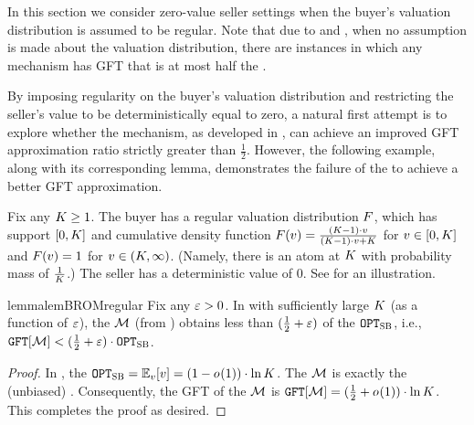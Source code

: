 
In this section we consider zero-value seller settings when the buyer's valuation distribution is assumed to be regular. Note that due to  and , when no assumption is made about the valuation distribution, there are instances in which any {\ksfair} mechanism has GFT that is at most half the {\SecondBest}.

By imposing regularity on the buyer's valuation distribution and restricting the seller's value to be deterministically equal to zero, a natural first attempt is to explore whether the {\BiasedRandomOffer} mechanism, as developed in , can achieve an improved GFT approximation ratio strictly greater than $\frac{1}{2}$. However, the following example, along with its corresponding lemma, demonstrates the failure of the {\BiasedRandomOffer} to achieve a better GFT approximation.

\begin{example}
\label{example:BROM:regular}
Fix any $K \geq 1$. The buyer has a regular valuation distribution $F$, which has support $[0, K]$ and cumulative density function $F(v) = \frac{(K - 1)\cdot v}{(K - 1)\cdot v + K}$ for $v \in[0,K]$ and $F(v) = 1$ for $v \in(K, \infty)$.
(Namely, there is an atom at $K$ with probability mass of $\frac{1}{K}$.)
The seller has a deterministic value of 0.
See  for an illustration.
\end{example}


\begin{restatable}{lemma}{lemBROMregular}
\label{lem:BROM:regular} 
    Fix any $\varepsilon > 0$. In  with sufficiently large $K$ (as a function of $\varepsilon$), the {\ksfair} {\BiasedRandomOffer} $\mathcal{M}$ (from ) obtains less than $(\frac{1}{2} + \varepsilon)$ of the {\SecondBest} $\texttt{OPT}_{\textsc{SB}}$, i.e., $\GFT{\mech} < (\frac{1}{2} + \eps)\cdot \OPTSB$.
\end{restatable}
\begin{proof}
    In , the {\SecondBest} $\OPTSB = \expect[\val]{\val} = (1 - o_{}(1))\cdot \ln\constantH$. The {\ksfair} {\BiasedRandomOffer} $\mathcal{M}$ is exactly the (unbiased) {\RandomOffer}. Consequently, the GFT of the {\BiasedRandomOffer} $\mathcal{M}$ is $\GFT{\mech} = (\frac{1}{2} + o_{}(1))\cdot \ln\constantH$. This completes the proof as desired. 
\end{proof}

